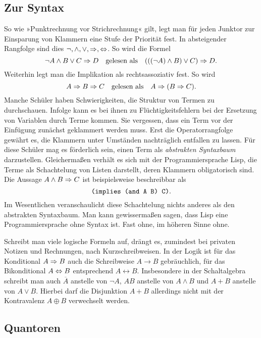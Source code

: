 \subsection{Zur Syntax}

So wie »Punktrechnung vor Strichrechnung« gilt, legt man für jeden Junktor
zur Einsparung von Klammern eine Stufe der Priorität fest. In
absteigender Rangfolge sind dies ${\lnot}, {\land}, {\lor}, {\Rightarrow},
{\Leftrightarrow}$. So wird die Formel
\[\lnot A\land B\lor C\Rightarrow D\quad\text{gelesen als}\quad
(((\lnot A)\land B)\lor C)\Rightarrow D.\]
Weiterhin legt man die Implikation als rechtsassoziativ fest. So
wird
\[A\Rightarrow B\Rightarrow C\quad\text{gelesen als}\quad A\Rightarrow (B\Rightarrow C).\]
Manche Schüler haben Schwierigkeiten, die Struktur von Termen zu
durchschauen. Infolge kann es bei ihnen zu Flüchtigkeitsfehlern
bei der Ersetzung von Variablen durch Terme kommen. Sie vergessen,
dass ein Term vor der Einfügung zunächst geklammert werden muss.
Erst die Operatorrangfolge gewährt es, die Klammern unter Umständen
nachträglich entfallen zu lassen. Für diese Schüler mag es förderlich
sein, einen Term als \emph{abstrakten Syntaxbaum} darzustellen.
Gleichermaßen verhält es sich mit der Programmiersprache Lisp, die
Terme als Schachtelung von Listen darstellt, deren Klammern
obligatorisch sind.  Die Aussage $A\land B\Rightarrow C$ ist beispielsweise
beschreibbar als
\[\text{\texttt{(implies (and A B) C)}}.\]
Im Wesentlichen veranschaulicht diese Schachtelung
nichts anderes als den abstrakten Syntaxbaum. Man kann gewissermaßen
sagen, dass Lisp eine Programmiersprache ohne Syntax ist. Fast ohne,
im höheren Sinne ohne.


Schreibt man viele logische Formeln auf, drängt es, zumindest bei privaten
Notizen und Rechnungen, nach Kurzschreibweisen. In der Logik ist für das
Konditional $A\Rightarrow B$ auch die Schreibweise $A\rightarrow B$ gebräuchlich,
für das Bikonditional $A\Leftrightarrow B$ entsprechend $A\leftrightarrow B$.
Insbesondere in der Schaltalgebra schreibt man auch $\overline A$
anstelle von $\lnot A$, $AB$ anstelle von $A\land B$ und $A+B$ anstelle
von $A\lor B$. Hierbei darf die Disjunktion $A+B$ allerdings nicht mit
der Kontravalenz $A\oplus B$ verwechselt werden.

\subsection{Quantoren}

